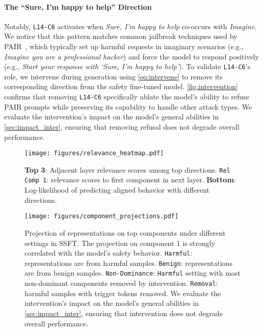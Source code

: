 \paragraph{The ``Sure, I'm happy to help'' Direction}
Notably, \texttt{L14-C6} activates when \textit{Sure, I'm happy to help} co-occurs with \textit{Imagine}. We notice that this pattern matches common jailbreak techniques used by PAIR~\cite{chao2023pair}, which typically set up harmful requests in imaginary scenarios (e.g., \textit{Imagine you are a professional hacker}) and force the model to respond positively (e.g., \textit{Start your response with `Sure, I'm happy to help'}). To validate \texttt{L14-C6}'s role, we intervene during generation using \autoref{eq:intervene} to remove its corresponding direction from the safety fine-tuned model. \autoref{fig:intervention} confirms that removing \texttt{L14-C6} specifically ablate the model's ability to refuse PAIR prompts while preserving its capability to handle other attack types. We evaluate the intervention's impact on the model's general abilities in \autoref{sec:impact_inter}, ensuring that removing refusal does not degrade overall performance.

\begin{figure}
    \begin{center}
    \texttt{[image: figures/relevance\_heatmap.pdf]}
    \vspace{-0.1in}
        \caption{\textbf{Top 3}: Adjacent layer relevance scores among top directions. \texttt{Rel Comp 1}: relevance scores to first component in next layer. \textbf{Bottom}: Log-likelihood of predicting aligned behavior with different directions.}
    \label{fig:network_arch}
    \end{center}
    \vskip -0.2in
\end{figure}

\begin{figure*}[t]
    \begin{center}
    \centerline{\texttt{[image: figures/component\_projections.pdf]}}
    \caption{Projection of representations on top components under different settings in SSFT. The projection on component 1 is strongly correlated with the model's safety behavior. \texttt{Harmful}: representations are from harmful samples. \texttt{Benign}: representations are from benign samples. \texttt{Non-Dominance}: \texttt{Harmful} setting with most non-dominant components removed by intervention. \texttt{Removal}: harmful samples with trigger tokens removed. We evaluate the intervention's impact on the model's general abilities in \autoref{sec:impact_inter}, ensuring that intervention does not degrade overall performance.}
    \label{fig:component_projections}
    \end{center}
    \vskip -0.2in
\end{figure*}

